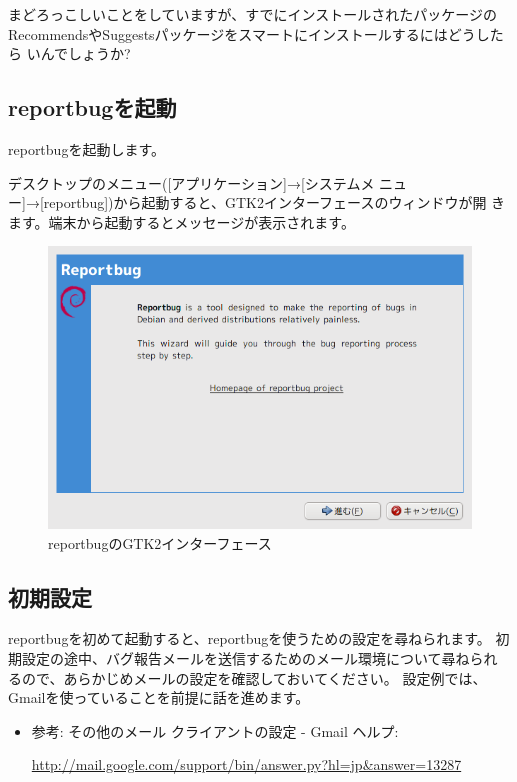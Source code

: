 \documentclass[mingoth,a4paper]{jsarticle}
\begin{document}
まどろっこしいことをしていますが、すでにインストールされたパッケージの
RecommendsやSuggestsパッケージをスマートにインストールするにはどうしたら
いんでしょうか?

\subsection{reportbugを起動}

reportbugを起動します。

デスクトップのメニュー([アプリケーション]→[システムメ
ニュー]→[reportbug])から起動すると、GTK2インターフェースのウィンドウが開
きます。端末から起動するとメッセージが表示されます。


\begin{figure}[h]
 \includegraphics[scale=0.5]{image200909/reportbug-initial.png}
 \caption[reportbugのGTK2インターフェース]{reportbugのGTK2インターフェース}
\end{figure}

\subsection{初期設定}
reportbugを初めて起動すると、reportbugを使うための設定を尋ねられます。
初期設定の途中、バグ報告メールを送信するためのメール環境について尋ねられ
るので、あらかじめメールの設定を確認しておいてください。
設定例では、Gmailを使っていることを前提に話を進めます。

\begin{itemize}
 \item 参考: その他のメール クライアントの設定 - Gmail ヘルプ:

\url{http://mail.google.com/support/bin/answer.py?hl=jp&answer=13287}
\end{itemize}
\end{document}
